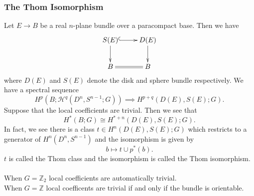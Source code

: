 \documentclass[11pt]{article}
\begin{document}
\begin{Jandr SSS notes}
\subsubsection{The Thom Isomorphism}
Let $E\to B$ be a real $n$-plane bundle over a paracompact base. Then we have 
\[\xymatrix{S(E)\ar@{^{(}->}[r]\ar[d] & D(E)\ar[d]\\ B\ar@{=}[r] & B}\]
where $D(E)$ and $S(E)$ denote the disk and sphere bundle respectively. We have a spectral sequence 
\[H^p(B;\mathscr{H}^q(D^n,S^{n-1};G))\implies H^{p+q}(D(E),S(E);G).\]
Suppose that the local coefficients are trivial. Then we see that
\[H^*(B;G)\cong H^{*+n}(D(E),S(E);G).\]
In fact, we see there is a class $t\in H^n(D(E),S(E);G)$ which restricts to a generator of $H^n(D^n,S^{n-1})$ and the isomorphism is given by
\[b\mapsto t\cup p^*(b).\]
$t$ is called the Thom class and the isomorphism is called the Thom isomorphism.\\
\\
When $G=\mathbb{Z}_2$ local coefficients are automatically trivial.\\
When $G=\mathbb{Z}$ local coefficents are trivial if and only if the bundle is orientable.

\pagebreak

\end{Jandr SSS notes}
\end{document}
